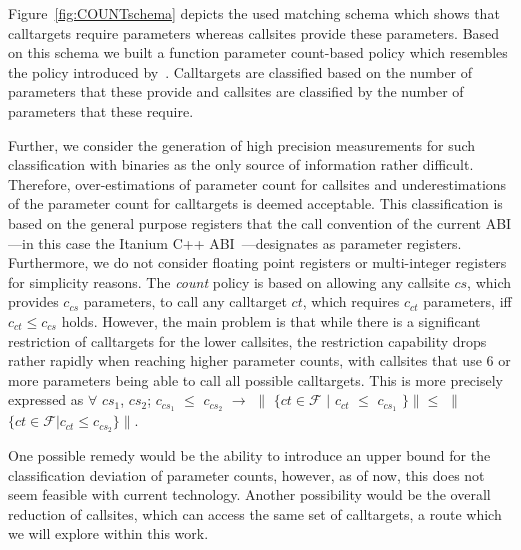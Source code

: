 Figure~\ref{fig:COUNTschema} depicts the used matching schema which shows that calltargets require
parameters whereas callsites provide these parameters. Based on this schema we built a function parameter count-based policy
which resembles the policy introduced by~\cite{veen:typearmor}. Calltargets are classified based on the number of parameters 
that these provide and callsites are classified by the number of parameters that these require. 

Further, we consider the generation of high precision measurements for such classification with binaries as the only source of information rather difficult. 
Therefore, over-estimations of parameter count for callsites and underestimations of the parameter count for calltargets is deemed acceptable. 
This classification is based on the general purpose registers that the call convention of the current ABI---in this case the 
Itanium C++ ABI~\cite{itanium:abi}---designates as parameter registers. Furthermore, we do not consider floating point registers or multi-integer registers for simplicity
reasons.
The \emph{count} policy is based on allowing any callsite $cs$, which provides $c_{cs}$ parameters, to call any calltarget $ct$, 
which requires $c_{ct}$ parameters, iff $c_{ct} \leq c_{cs}$ holds. However, the main problem is that while there is a significant 
restriction of calltargets for the lower callsites, the restriction capability drops rather rapidly when reaching higher parameter 
counts, with callsites that use 6 or more parameters being able to call all possible calltargets.
This is more precisely expressed as 
$\forall$ $cs_1$, $cs_2$; $c_{cs_1}$ $\leq$ $c_{cs_2}$ $\rightarrow$  $\|$ $\{ct \in \mathcal{F}$ $|$ $c_{ct}$ $\leq$ $c_{cs_1}$ $\} \| \leq$ $\|$ $\{ct \in \mathcal{F} | c_{ct} \leq c_{cs_2}  \} \|$.

One possible remedy would be the ability to introduce an upper bound for the classification deviation of parameter counts, 
however, as of now, this does not seem feasible with current technology. Another possibility would be the overall reduction
of callsites, which can access the same set of calltargets, a route which we will explore within this work.



